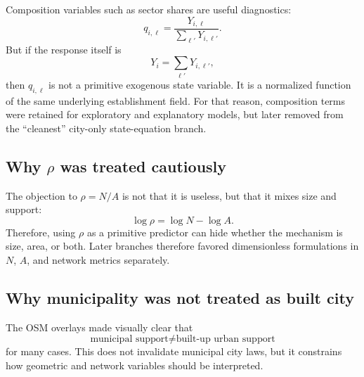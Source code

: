 \documentclass[11pt]{article}
\begin{document}
Composition variables such as sector shares are useful diagnostics:
\begin{equation}
q_{i,\ell} = \frac{Y_{i,\ell}}{\sum_{\ell'} Y_{i,\ell'}}.
\end{equation}
But if the response itself is
\begin{equation}
Y_i = \sum_{\ell'} Y_{i,\ell'},
\end{equation}
then \(q_{i,\ell}\) is not a primitive exogenous state variable. It is a normalized function of the same underlying establishment field. For that reason, composition terms were retained for exploratory and explanatory models, but later removed from the ``cleanest'' city-only state-equation branch.

\subsection{Why \(\rho\) was treated cautiously}

The objection to \(\rho=N/A\) is not that it is useless, but that it mixes size and support:
\begin{equation}
\log \rho = \log N - \log A.
\end{equation}
Therefore, using \(\rho\) as a primitive predictor can hide whether the mechanism is size, area, or both. Later branches therefore favored dimensionless formulations in \(N\), \(A\), and network metrics separately.

\subsection{Why municipality was not treated as built city}

The OSM overlays made visually clear that
\begin{equation}
\text{municipal support} \neq \text{built-up urban support}
\end{equation}
for many cases. This does not invalidate municipal city laws, but it constrains how geometric and network variables should be interpreted.



\end{document}

